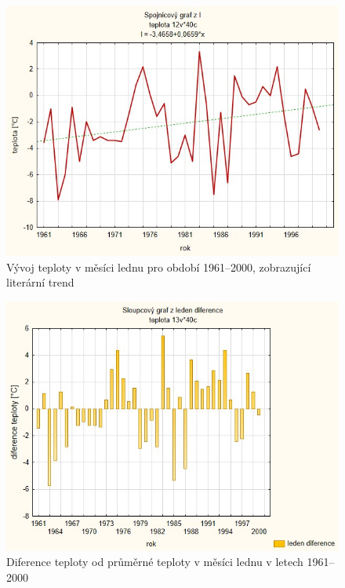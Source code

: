 \documentclass{article}
\begin{document}
	\begin{figure}[h]
	\centering
	\includegraphics[width=0.9\linewidth]{Stats1.jpg}
	\caption{Vývoj teploty v měsíci lednu pro období 1961--2000, zobrazující literární trend}
	\label{fig:GrafinStats1}
	\end{figure}

\begin{figure}
\centering
\includegraphics[width=0.9\linewidth]{GrafinPS1}
\caption{Diference teploty od průměrné teploty v měsíci lednu v letech 1961--2000}
\label{fig:GrafinPS1}
\end{figure}
\end{document}
